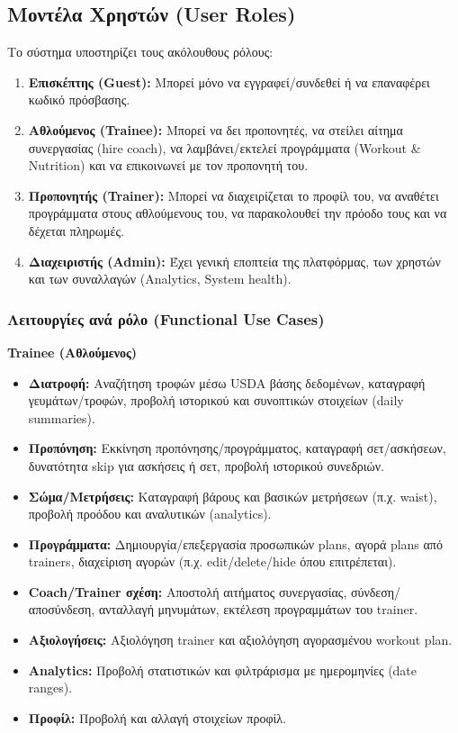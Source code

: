\documentclass[12pt,a4paper]{report}
\begin{document}
\subsection{Μοντέλα Χρηστών (User Roles)}
Το σύστημα υποστηρίζει τους ακόλουθους ρόλους:
\begin{enumerate}
    \item \textbf{Επισκέπτης (Guest):} Μπορεί μόνο να εγγραφεί/συνδεθεί ή να επαναφέρει κωδικό πρόσβασης.
    \item \textbf{Αθλούμενος (Trainee):} Μπορεί να δει προπονητές, να στείλει αίτημα συνεργασίας (hire coach), να λαμβάνει/εκτελεί προγράμματα (Workout \& Nutrition) και να επικοινωνεί με τον προπονητή του.
    \item \textbf{Προπονητής (Trainer):} Μπορεί να διαχειρίζεται το προφίλ του, να αναθέτει προγράμματα στους αθλούμενους του, να παρακολουθεί την πρόοδο τους και να δέχεται πληρωμές.
    \item \textbf{Διαχειριστής (Admin):} Έχει γενική εποπτεία της πλατφόρμας, των χρηστών και των συναλλαγών (Analytics, System health).
\end{enumerate}

\subsubsection{Λειτουργίες ανά ρόλο (Functional Use Cases)}
\textbf{Trainee (Αθλούμενος)}
\begin{itemize}[label=•]
    \item \textbf{Διατροφή:} Αναζήτηση τροφών μέσω \textenglish{USDA} βάσης δεδομένων, καταγραφή γευμάτων/τροφών, προβολή ιστορικού και συνοπτικών στοιχείων (daily summaries).
    \item \textbf{Προπόνηση:} Εκκίνηση προπόνησης/προγράμματος, καταγραφή σετ/ασκήσεων, δυνατότητα \textenglish{skip} για ασκήσεις ή σετ, προβολή ιστορικού συνεδριών.
    \item \textbf{Σώμα/Μετρήσεις:} Καταγραφή βάρους και βασικών μετρήσεων (π.χ. waist), προβολή προόδου και αναλυτικών (analytics).
    \item \textbf{Προγράμματα:} Δημιουργία/επεξεργασία προσωπικών plans, αγορά plans από trainers, διαχείριση αγορών (π.χ. edit/delete/hide όπου επιτρέπεται).
    \item \textbf{Coach/Trainer σχέση:} Αποστολή αιτήματος συνεργασίας, σύνδεση/αποσύνδεση, ανταλλαγή μηνυμάτων, εκτέλεση προγραμμάτων του trainer.
    \item \textbf{Αξιολογήσεις:} Αξιολόγηση trainer και αξιολόγηση αγορασμένου workout plan.
    \item \textbf{Analytics:} Προβολή στατιστικών και φιλτράρισμα με ημερομηνίες (date ranges).
    \item \textbf{Προφίλ:} Προβολή και αλλαγή στοιχείων προφίλ.
\end{itemize}
\end{document}
